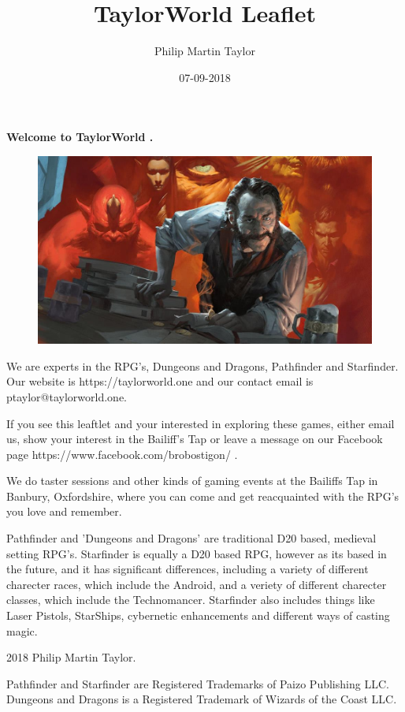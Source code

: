 \documentclass[12pt,a4paper]{book}
\date{07-09-2018}
\author{Philip Martin Taylor}
\title{TaylorWorld Leaflet}
\begin{document}
\begin{center}
\textbf{Welcome to TaylorWorld \texttrademark.}
\end{center}
\begin{figure}[h]
  \centering
  \includegraphics[scale=0.15]{alchemist.jpg}
\end{figure}
\begin{flushleft}
We are experts in the RPG's, Dungeons and Dragons, Pathfinder and Starfinder. Our website is https://taylorworld.one and our contact email is ptaylor@taylorworld.one.
\end{flushleft}
\begin{flushleft}
  If you see this leaftlet and your interested in exploring these games, either email us, show your interest in the Bailiff's Tap or leave a message on our Facebook page https://www.facebook.com/brobostigon/ .
\end{flushleft}
\begin{flushleft}
  We do taster sessions and other kinds of gaming events at the Bailiffs Tap in Banbury, Oxfordshire, where you can come and get reacquainted with the RPG's you love and remember.
\end{flushleft}
\begin{flushleft}
  Pathfinder and 'Dungeons and Dragons' are traditional D20 based, medieval setting RPG's. Starfinder is equally a D20 based RPG, however as its based in the future, and it has significant differences, including a variety of different charecter races, which include the Android, and a veriety of different charecter classes, which include the Technomancer. Starfinder also includes things like Laser Pistols, StarShips, cybernetic enhancements and different ways of casting magic.
\end{flushleft}
\begin{center}
  \textcopyright{} 2018 Philip Martin Taylor.
\end{center}
\begin{center}
  Pathfinder and Starfinder are Registered Trademarks of Paizo Publishing LLC. Dungeons and Dragons is a Registered Trademark of Wizards of the Coast LLC.
\end{center}
\end{document}
